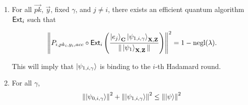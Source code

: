 \begin{lemma}
\begin{enumerate}
		\item \label{property:partition-binding}

			For all $\vec{pk}$, $\vec{y}$, fixed $\gamma$, and $j\neq i$, there exists an efficient quantum algorithm $\mathsf{Ext}_i$ such that

			\begin{align}
				\left\lVert P_{i,pk_i,y_i,acc} \circ \mathsf{Ext}_i\left(\frac{\ket{e_j}_{\mathbf{C}}\ket{\psi_{1,i,\gamma}}_{\mathbf{X},\mathbf{Z}}}{\|\ket{\psi_1}_{\mathbf{X},\mathbf{Z}}\|}\right)\right\rVert^2 =1-\operatorname{negl}(\lambda).
			\end{align}

			This will imply that    $\ket{\psi_{1,i,\gamma}}$ is binding to the $i$-th Hadamard round.

		\item \label{property-partition-norm-sum}
			For all $\gamma$,
			\begin{align}
				\left\lVert\ket{\psi_{0,i,\gamma}}\right\rVert^2+ \left\lVert\ket{\psi_{1,i,\gamma}}\right\rVert^2 \leq  \left\lVert\ket{\psi}\right\rVert^2
			\end{align}






	\end{enumerate}
\end{lemma}








